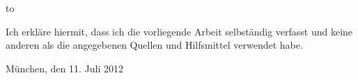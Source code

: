 \thispagestyle{empty}
\vspace*{42\baselineskip}
\hbox to \textwidth{\hrulefill}
\par
Ich erkläre hiermit, dass ich die vorliegende Arbeit selbständig verfasst und
keine anderen als die angegebenen Quellen und Hilfsmittel verwendet habe.

München, den 11. Juli 2012

\clearpage






